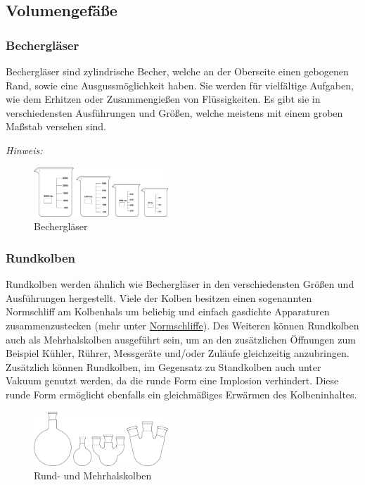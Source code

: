 \pagebreak

\subsection{Volumengefäße}
\subsubsection{Bechergläser}
Bechergläser sind zylindrische Becher, welche an der Oberseite einen gebogenen Rand, sowie eine Ausgussmöglichkeit haben. Sie werden für vielfältige Aufgaben, wie dem Erhitzen oder Zusammengießen von Flüssigkeiten. Es gibt sie in verschiedensten Ausführungen und Größen, welche meistens mit einem groben Maßstab versehen sind.\\
\vspace*{-5mm}

\textit{Hinweis:}\\
\vspace*{-5mm}

\begin{figure}[h!]
	\centering
	\includegraphics[width=0.45\textwidth]{img/becherglas}
	\caption{Bechergläser}
	\label{fig:becherglas}
\end{figure}
\FloatBarrier
\vspace*{-10mm}

\subsubsection{Rundkolben}
Rundkolben werden ähnlich wie Bechergläser in den verschiedensten Größen und Ausführungen hergestellt. Viele der Kolben besitzen einen sogenannten Normschliff am Kolbenhals um beliebig und einfach gasdichte Apparaturen zusammenzustecken (mehr unter \hyperlink{Normschliff}{Normschliffe}). Des Weiteren können Rundkolben auch als Mehrhalskolben ausgeführt sein, um an den zusätzlichen Öffnungen zum Beispiel Kühler, Rührer, Messgeräte und/oder Zuläufe gleichzeitig anzubringen. Zusätzlich können Rundkolben, im Gegensatz zu Standkolben auch unter Vakuum genutzt werden, da die runde Form eine Implosion verhindert. Diese runde Form ermöglicht ebenfalls ein gleichmäßiges Erwärmen des Kolbeninhaltes.
\begin{figure}[h!]
	\centering
	\includegraphics[width=0.45\textwidth]{img/rundkolben}
	\caption{Rund- und Mehrhalskolben}
	\label{fig:rundkolben}
\end{figure}
\FloatBarrier

